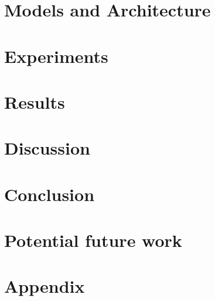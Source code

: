 \documentclass[a4paper]{article}
\begin{document}
\section{Models and Architecture}

\section{Experiments}


\section{Results}


\section{Discussion}


\section{Conclusion}

\section{Potential future work}


{}


\newpage
\section{Appendix}

\end{document}
